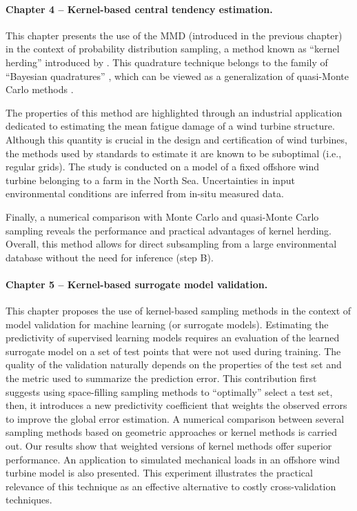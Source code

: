 \paragraph{Chapter 4 -- Kernel-based central tendency estimation.} 
This chapter presents the use of the MMD (introduced in the previous chapter) in the context of probability distribution sampling, a method known as ``kernel herding'' introduced by \citet{chen_welling_2010}. 
This quadrature technique belongs to the family of ``Bayesian quadratures'' \citep{briol_oates_2019}, which can be viewed as a generalization of quasi-Monte Carlo methods \citep{hickernell_2020}. 

The properties of this method are highlighted through an industrial application dedicated to estimating the mean fatigue damage of a wind turbine structure. 
Although this quantity is crucial in the design and certification of wind turbines, the methods used by standards to estimate it are known to be suboptimal (i.e., regular grids). 
The study is conducted on a model of a fixed offshore wind turbine belonging to a farm in the North Sea. 
Uncertainties in input environmental conditions are inferred from in-situ measured data. 

Finally, a numerical comparison with Monte Carlo and quasi-Monte Carlo sampling reveals the performance and practical advantages of kernel herding. 
Overall, this method allows for direct subsampling from a large environmental database without the need for inference (step B).


\paragraph{Chapter 5 -- Kernel-based surrogate model validation.} 
This chapter proposes the use of kernel-based sampling methods in the context of model validation for machine learning (or surrogate models). 
Estimating the predictivity of supervised learning models requires an evaluation of the learned surrogate model on a set of test points that were not used during training. 
The quality of the validation naturally depends on the properties of the test set and the metric used to summarize the prediction error. 
This contribution first suggests using space-filling sampling methods to ``optimally'' select a test set, then, 
it introduces a new predictivity coefficient that weights the observed errors to improve the global error estimation. 
A numerical comparison between several sampling methods based on geometric approaches \citep{shang_apley_2020} or kernel methods \citep{chen_welling_2010,mak_joseph_2018} is carried out. 
Our results show that weighted versions of kernel methods offer superior performance. 
An application to simulated mechanical loads in an offshore wind turbine model is also presented. 
This experiment illustrates the practical relevance of this technique as an effective alternative to costly cross-validation techniques.

